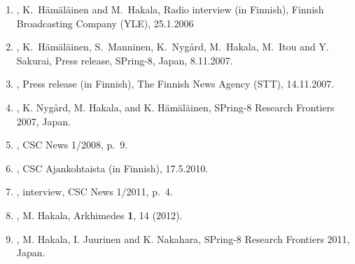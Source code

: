 \documentclass[12pt,a4]{report}
\begin{document}
\begin{enumerate}

\item {}, K.~H\"am\"al\"ainen and M.~Hakala, Radio interview (in Finnish), Finnish Broadcasting Company (YLE), 25.1.2006

\item {}, K.~H\"am\"al\"ainen, S.~Manninen, K.~Ny\-g{\aa}rd, M.~Hakala, M.~Itou and Y. Sakurai, Press release, SPring-8, Japan, 8.11.2007.

\item {}, Press release (in Finnish), The Finnish News Agency (STT), 14.11.2007.

\item {}, K. Nyg{\aa}rd, M. Hakala, and K. H\"am\"al\"ainen, SPring-8 Research Frontiers 2007, Japan.

\item {}, CSC News 1/2008, p.~9.

\item {}, CSC Ajankohtaista (in Finnish), 17.5.2010.

\item {}, interview, CSC News 1/2011, p.~4. 

\item {}, M. Hakala, Arkhimedes {\bf 1}, 14 (2012).

\item {}, M. Hakala, I. Juurinen and K. Nakahara, SPring-8 Research Frontiers 2011, Japan.


\end{enumerate}
\end{document}
